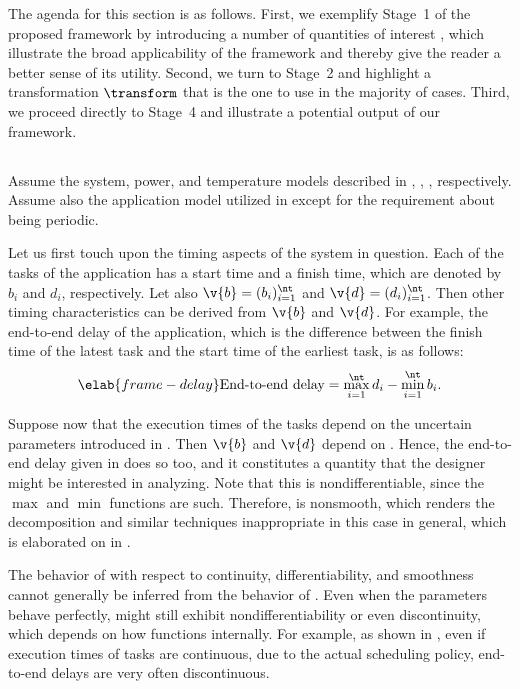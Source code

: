 The agenda for this section is as follows. First, we exemplify Stage~1 of the
proposed framework by introducing a number of quantities of interest \g, which
illustrate the broad applicability of the framework and thereby give the reader
a better sense of its utility. Second, we turn to Stage~2 and highlight a
transformation $\transform$ that is the one to use in the majority of cases.
Third, we proceed directly to Stage~4 and illustrate a potential output of our
framework.

\subsection{\problemtitle}

Assume the system, power, and temperature models described in
, , , respectively.
Assume also the application model utilized in 
except for the requirement about being periodic.

Let us first touch upon the timing aspects of the system in question. Each of
the \nt tasks of the application has a start time and a finish time, which are
denoted by $b_i$ and $d_i$, respectively. Let also $\v{b} = (b_i)_{i = 1}^\nt$
and $\v{d} = (d_i)_{i = 1}^\nt$. Then other timing characteristics can be
derived from $\v{b}$ and $\v{d}$. For example, the end-to-end delay of the
application, which is the difference between the finish time of the latest task
and the start time of the earliest task, is as follows:
\begin{equation} \elab{frame-delay}
  \text{End-to-end delay}
  = \max_{i = 1}^\nt d_i - \min_{i = 1}^\nt b_i.
\end{equation}

Suppose now that the execution times of the tasks depend on the uncertain
parameters \vu introduced in . Then $\v{b}$ and $\v{d}$
depend on \vu. Hence, the end-to-end delay given in  does so
too, and it constitutes a quantity \g that the designer might be interested in
analyzing. Note that this \g is nondifferentiable, since the $\max$ and $\min$
functions are such. Therefore, \g is nonsmooth, which renders the 
decomposition and similar techniques inappropriate in this case in general,
which is elaborated on in .

\begin{remark} 
The behavior of \g with respect to continuity, differentiability, and smoothness
cannot generally be inferred from the behavior of \vu. Even when the parameters
behave perfectly, \g might still exhibit nondifferentiability or even
discontinuity, which depends on how \g functions internally. For example, as
shown in \cite{tanasa2015}, even if execution times of tasks are continuous, due
to the actual scheduling policy, end-to-end delays are very often discontinuous.
\end{remark}

